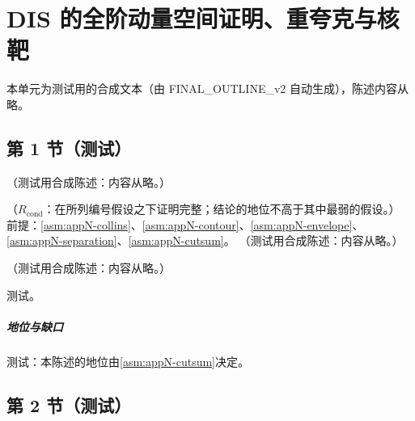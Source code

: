 \chapter{DIS 的全阶动量空间证明、重夸克与核靶}\label{ch:disall}
本单元为测试用的合成文本（由 FINAL\_OUTLINE\_v2 自动生成），陈述内容从略。

\section{第 1 节（测试）}\label{sec:disall-regions}

\begin{definition}\label{def:disall-breit}
（测试用合成陈述：内容从略。）
\end{definition}

\begin{proposition}\label{prop:disall-two-routes}
（$R_{\mathrm{cond}}$：在所列编号假设之下证明完整；结论的地位不高于其中最弱的假设。）
前提：\cref{asm:appN-collins}、\cref{asm:appN-contour}、\cref{asm:appN-envelope}、\cref{asm:appN-separation}、\cref{asm:appN-cutsum}。
（测试用合成陈述：内容从略。）
\end{proposition}

\begin{lemma}\label{lem:disall-fsi}
（测试用合成陈述：内容从略。）
\end{lemma}
\begin{proofsketch}测试。\end{proofsketch}
\paragraph{地位与缺口}测试：本陈述的地位由\cref{asm:appN-cutsum}决定。

\section{第 2 节（测试）}\label{sec:disall-fsi}


